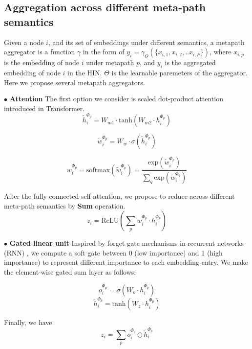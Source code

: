 \subsection{Aggregation across different meta-path semantics}
Given a node $i$, and its set of embeddings under different semantics, a metapath aggregator is a function $\gamma$ in the form of $y_i = \gamma_\Theta(\{x_{i,1},x_{i,2},..x_{i,P}\})$, where $x_{i,p}$ is the embedding of node $i$ under metapath $p$, and $y_i$ is the aggregated embedding of node $i$ in the HIN. $\Theta$ is the learnable paremeters of the aggregator.
Here we propose several metapath aggregators. 

$\bullet$ \textbf{Attention}
 The first option we consider is scaled dot-product attention introduced in Transformer. 
\begin{equation}
\label{eq:mp_mlp}
\tilde{h}^{\Phi_p}_i = W_{m1} \cdot \text{tanh}(W_{m2} \cdot h^{\Phi_p}_i)
\end{equation}

\begin{equation}
\label{eq:mp_attn}
\tilde{w}_i^{\Phi_p} = W_w \cdot \sigma(\tilde{h}^{\Phi_p}_i)
\end{equation}

\begin{equation}
\label{eq:mp_soft}
w_i^{\Phi_p} = \text{softmax}(\tilde{w}_i^{\Phi_p}) = \dfrac{\text{exp}(\tilde{w}_i^{\Phi_p})}{\sum_q \text{exp}(\tilde{w}_i^{\Phi_q})}
\end{equation}

After the fully-connected self-attention, we propose to reduce across different meta-path semantics by \textbf{Sum} operation.
\begin{equation}
\label{eq:mp_asum}
z_i = \text{ReLU}(\sum_p w_i^{\Phi_p} \cdot h^{\Phi_p}_i)
\end{equation}

$\bullet$ \textbf{Gated linear unit}
Inspired by forget gate mechanisms in recurrent networks (RNN) , we compute a soft gate between 0 (low importance) and 1 (high importance) to represent different importance to each embedding entry.
We make the element-wise gated sum layer as follows:
\begin{multicols}{2}
\begin{equation}
o^{\Phi_p}_i=\sigma(W_o \cdot h^{\Phi_p}_i)
\end{equation}\break
\begin{equation}
\tilde{h}^{\Phi_p}_i=\text{tanh}(W_z \cdot h^{\Phi_p}_i)
\end{equation}
\end{multicols}
Finally, we have
\begin{equation}
\label{eq:mp_sum}
{z}_i= \sum_p o^{\Phi_p}_i\odot \tilde{h}^{\Phi_p}_i
\end{equation}


